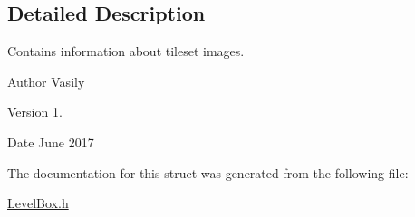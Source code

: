 \subsection{Detailed Description}
Contains information about tileset images. 

\begin{DoxyAuthor}{Author}
Vasily 
\end{DoxyAuthor}
\begin{DoxyVersion}{Version}
1. 
\end{DoxyVersion}
\begin{DoxyDate}{Date}
June 2017 
\end{DoxyDate}


The documentation for this struct was generated from the following file\+:\begin{DoxyCompactItemize}
\item 
\hyperlink{_level_box_8h}{Level\+Box.\+h}\end{DoxyCompactItemize}
